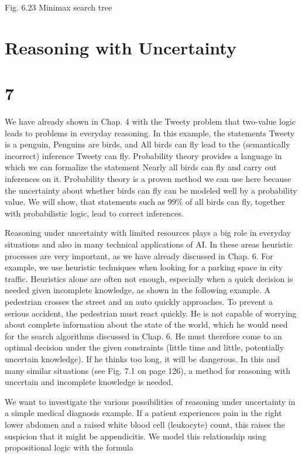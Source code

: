 \documentclass[10pt]{article}
\begin{document}
Fig. 6.23 Minimax search tree

\section*{Reasoning with Uncertainty}
\section*{7}
We have already shown in Chap. 4 with the Tweety problem that two-value logic leads to problems in everyday reasoning. In this example, the statements Tweety is a penguin, Penguins are birds, and All birds can fly lead to the (semantically incorrect) inference Tweety can fly. Probability theory provides a language in which we can formalize the statement Nearly all birds can fly and carry out inferences on it. Probability theory is a proven method we can use here because the uncertainty about whether birds can fly can be modeled well by a probability value. We will show, that statements such as $99 \%$ of all birds can fly, together with probabilistic logic, lead to correct inferences.

Reasoning under uncertainty with limited resources plays a big role in everyday situations and also in many technical applications of AI. In these areas heuristic processes are very important, as we have already discussed in Chap. 6. For example, we use heuristic techniques when looking for a parking space in city traffic. Heuristics alone are often not enough, especially when a quick decision is needed given incomplete knowledge, as shown in the following example. A pedestrian crosses the street and an auto quickly approaches. To prevent a serious accident, the pedestrian must react quickly. He is not capable of worrying about complete information about the state of the world, which he would need for the search algorithms discussed in Chap. 6. He must therefore come to an optimal decision under the given constraints (little time and little, potentially uncertain knowledge). If he thinks too long, it will be dangerous. In this and many similar situations (see Fig. 7.1 on page 126), a method for reasoning with uncertain and incomplete knowledge is needed.

We want to investigate the various possibilities of reasoning under uncertainty in a simple medical diagnosis example. If a patient experiences pain in the right lower abdomen and a raised white blood cell (leukocyte) count, this raises the suspicion that it might be appendicitis. We model this relationship using propositional logic with the formula
\end{document}
